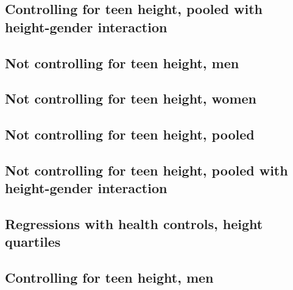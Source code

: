 \begin{landscape}
\subsection{Controlling for teen height, pooled with height-gender interaction}

\end{landscape}

\begin{landscape}
\subsection{Not controlling for teen height, men}

\end{landscape}

\begin{landscape}
\subsection{Not controlling for teen height, women}

\end{landscape}

\begin{landscape}
\subsection{Not controlling for teen height, pooled}

\end{landscape}

\begin{landscape}
\subsection{Not controlling for teen height, pooled with height-gender interaction}

\end{landscape}


\begin{landscape}
\section{Regressions with health controls, height quartiles}
\subsection{Controlling for teen height, men}

\end{landscape}

